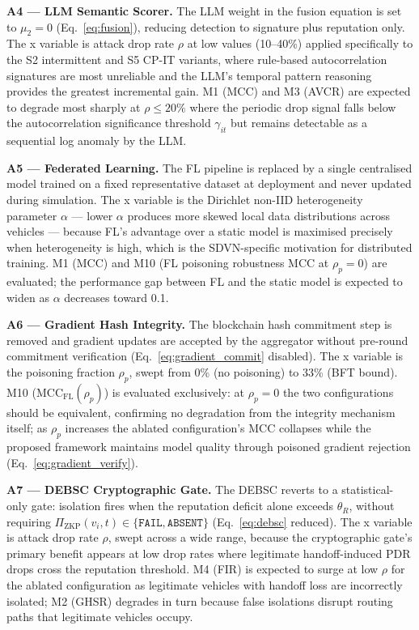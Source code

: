 \documentclass[12pt, a4paper]{report}
\newcommand{\mypar}{\vspace{0.8em}\noindent}
\begin{document}
\mypar
\textbf{A4 --- LLM Semantic Scorer.}
The LLM weight in the fusion equation is set to $\mu_2 = 0$
(Eq.~\eqref{eq:fusion}), reducing detection to signature plus reputation
only. The x variable is attack drop rate $\rho$ at low values
(10--40\%) applied specifically to the S2 intermittent and S5 CP-IT
variants, where rule-based autocorrelation signatures are most unreliable
and the LLM's temporal pattern reasoning provides the greatest incremental
gain. M1 (MCC) and M3 (AVCR) are expected to degrade most sharply at
$\rho \leq 20\%$ where the periodic drop signal falls below the
autocorrelation significance threshold $\gamma_{it}$ but remains
detectable as a sequential log anomaly by the LLM.

\mypar
\textbf{A5 --- Federated Learning.}
The FL pipeline is replaced by a single centralised model trained on a
fixed representative dataset at deployment and never updated during
simulation. The x variable is the Dirichlet non-IID heterogeneity
parameter $\alpha$ — lower $\alpha$ produces more skewed local data
distributions across vehicles — because FL's advantage over a static
model is maximised precisely when heterogeneity is high, which is the
SDVN-specific motivation for distributed training. M1 (MCC) and M10
(FL poisoning robustness MCC at $\rho_p = 0$) are evaluated; the
performance gap between FL and the static model is expected to widen as
$\alpha$ decreases toward 0.1.

\mypar
\textbf{A6 --- Gradient Hash Integrity.}
The blockchain hash commitment step is removed and gradient updates are
accepted by the aggregator without pre-round commitment verification
(Eq.~\eqref{eq:gradient_commit} disabled). The x variable is the
poisoning fraction $\rho_p$, swept from 0\% (no poisoning) to 33\%
(BFT bound). M10 ($\text{MCC}_{\text{FL}}(\rho_p)$) is evaluated
exclusively: at $\rho_p = 0$ the two configurations should be
equivalent, confirming no degradation from the integrity mechanism
itself; as $\rho_p$ increases the ablated configuration's MCC collapses
while the proposed framework maintains model quality through poisoned
gradient rejection (Eq.~\eqref{eq:gradient_verify}).

\mypar
\textbf{A7 --- DEBSC Cryptographic Gate.}
The DEBSC reverts to a statistical-only gate: isolation fires when the
reputation deficit alone exceeds $\theta_R$, without requiring
$\Pi_{\text{ZKP}}(v_i,t) \in \{\texttt{FAIL}, \texttt{ABSENT}\}$
(Eq.~\eqref{eq:debsc} reduced). The x variable is attack drop rate
$\rho$, swept across a wide range, because the cryptographic gate's
primary benefit appears at low drop rates where legitimate
handoff-induced PDR drops cross the reputation threshold. M4 (FIR)
is expected to surge at low $\rho$ for the ablated configuration as
legitimate vehicles with handoff loss are incorrectly isolated;
M2 (GHSR) degrades in turn because false isolations disrupt routing
paths that legitimate vehicles occupy.
\end{document}
